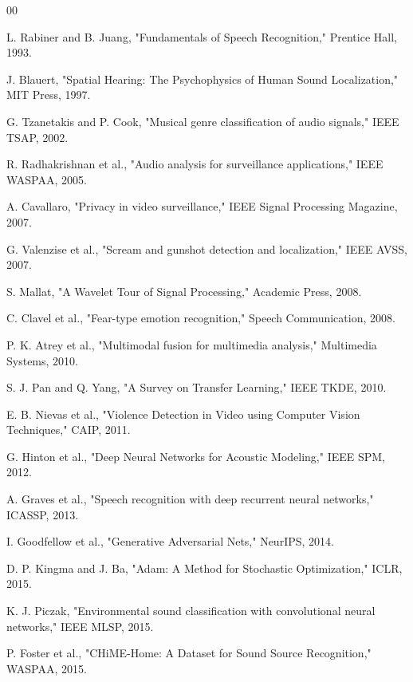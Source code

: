 \documentclass[conference]{IEEEtran}
\begin{document}
\begin{thebibliography}{00}

 L. Rabiner and B. Juang, "Fundamentals of Speech Recognition," Prentice Hall, 1993.

 J. Blauert, "Spatial Hearing: The Psychophysics of Human Sound Localization," MIT Press, 1997.

 G. Tzanetakis and P. Cook, "Musical genre classification of audio signals," IEEE TSAP, 2002.

 R. Radhakrishnan et al., "Audio analysis for surveillance applications," IEEE WASPAA, 2005.

 A. Cavallaro, "Privacy in video surveillance," IEEE Signal Processing Magazine, 2007.

 G. Valenzise et al., "Scream and gunshot detection and localization," IEEE AVSS, 2007.

 S. Mallat, "A Wavelet Tour of Signal Processing," Academic Press, 2008.

 C. Clavel et al., "Fear-type emotion recognition," Speech Communication, 2008.

 P. K. Atrey et al., "Multimodal fusion for multimedia analysis," Multimedia Systems, 2010.

 S. J. Pan and Q. Yang, "A Survey on Transfer Learning," IEEE TKDE, 2010.

 E. B. Nievas et al., "Violence Detection in Video using Computer Vision Techniques," CAIP, 2011.

 G. Hinton et al., "Deep Neural Networks for Acoustic Modeling," IEEE SPM, 2012.

 A. Graves et al., "Speech recognition with deep recurrent neural networks," ICASSP, 2013.

 I. Goodfellow et al., "Generative Adversarial Nets," NeurIPS, 2014.

 D. P. Kingma and J. Ba, "Adam: A Method for Stochastic Optimization," ICLR, 2015.

 K. J. Piczak, "Environmental sound classification with convolutional neural networks," IEEE MLSP, 2015.

 P. Foster et al., "CHiME-Home: A Dataset for Sound Source Recognition," WASPAA, 2015.


\end{thebibliography}
\end{document}
